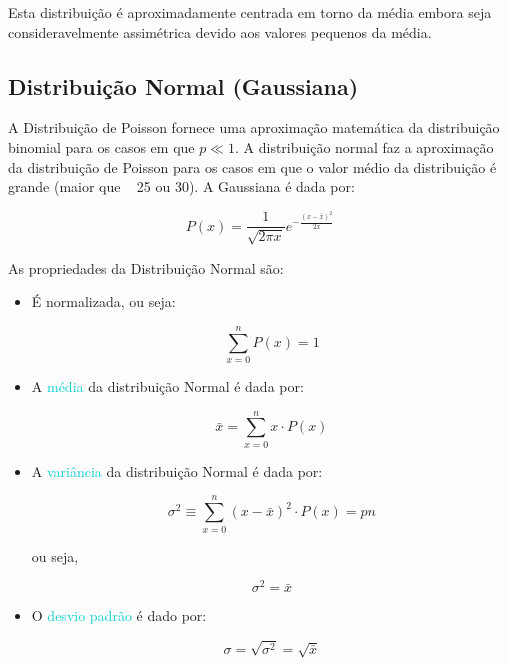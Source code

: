\documentclass[11pt,a4paper]{article}
\begin{document}
		Esta distribuição é aproximadamente centrada em torno da média embora seja consideravelmente assimétrica devido aos valores pequenos da média.


	\subsection*{Distribuição Normal (Gaussiana)}

		A Distribuição de Poisson fornece uma aproximação matemática da distribuição binomial para os casos em que $p \ll 1$. A distribuição normal faz a aproximação da distribuição de Poisson para os casos em que o valor médio da distribuição é grande (maior que ~ 25 ou 30). A Gaussiana é dada por:

			\begin{equation}
				P(x) = \frac{1}{\sqrt{2 \pi x}} e^{-\frac{(x - \bar{x})^2}{2\bar{x}}}
			\end{equation}

		As propriedades da Distribuição Normal são:

			\begin{itemize}
				\item É normalizada, ou seja:
				
					\begin{equation}
						\sum_{x = 0}^{n} P(x) = 1
					\end{equation}

				\item A \textcolor{DarkTurquoise}{média} da distribuição Normal é dada por:
			
					\begin{equation}
						\bar{x} = \sum_{x = 0}^{n} x \cdot P(x)
					\end{equation}
	
				\item A \textcolor{DarkTurquoise}{variância} da distribuição Normal é dada por:
				
					\begin{equation}
						\sigma^2 \equiv \sum_{x = 0}^{n} (x - \bar{x})^2 \cdot P(x) = pn
					\end{equation}
	
					ou seja,
	
					\begin{equation}
						\sigma^2 = \bar{x}
					\end{equation}
	
				\item O \textcolor{DarkTurquoise}{desvio padrão} é dado por:
				
					\begin{equation}
						\sigma = \sqrt{\sigma^2} = \sqrt{\bar{x}}
					\end{equation}
			\end{itemize}
\end{document}
